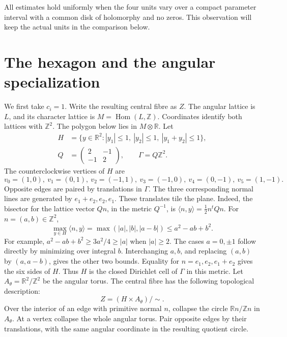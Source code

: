 All estimates hold uniformly when the four units vary over a compact
parameter interval with a common disk of holomorphy and no zeros.
This observation will keep the actual units in the comparison below.

\section{The hexagon and the angular specialization}

We first take $c_i=1$. Write the resulting central fibre as $Z$.
The angular lattice is $L$, and its character lattice is
$M=\operatorname{Hom}(L,\mathbb Z)$.
Coordinates identify both lattices with $\mathbb Z^2$.
The polygon below lies in $M\otimes\mathbb R$.
Let
\begin{equation}\label{c26:eq:hexagon}
\begin{split}
H&=\{y\in\mathbb R^2: |y_1|\le1,\ |y_2|\le1,\ |y_1+y_2|\le1\},\\
Q&=\begin{pmatrix}2&-1\\-1&2\end{pmatrix},\qquad \Gamma=Q\mathbb Z^2.
\end{split}
\end{equation}
The counterclockwise vertices of $H$ are
\[
v_0=(1,0),\ v_1=(0,1),\ v_2=(-1,1),\ v_3=(-1,0),\
v_4=(0,-1),\ v_5=(1,-1).
\]
Opposite edges are paired by translations in $\Gamma$.
The three corresponding normal lines are generated by
$e_1+e_2,e_2,e_1$.
These translates tile the plane.
Indeed, the bisector for the lattice vector $Qn$, in the metric $Q^{-1}$,
is $\langle n,y\rangle=\frac12n^tQn$.
For $n=(a,b)\in\mathbb Z^2$,
\[
\max_{y\in H}\langle n,y\rangle
 =\max(|a|,|b|,|a-b|)\le a^2-ab+b^2.
\]
For example, $a^2-ab+b^2\ge3a^2/4\ge|a|$ when $|a|\ge2$.
The cases $a=0,\pm1$ follow directly by minimizing over integral $b$.
Interchanging $a,b$, and replacing $(a,b)$ by $(a,a-b)$,
gives the other two bounds.
Equality for $n=e_1,e_2,e_1+e_2$ gives the six sides of $H$.
Thus $H$ is the closed Dirichlet cell of $\Gamma$ in this metric.
Let $A_\theta=\mathbb R^2/\mathbb Z^2$ be the angular torus.
The central fibre has the following topological description:
\begin{equation}\label{c26:eq:Z}
Z=(H\times A_\theta)/\sim.
\end{equation}
Over the interior of an edge with primitive normal $n$, collapse the
circle $\mathbb Rn/\mathbb Zn$ in $A_\theta$.
At a vertex collapse the whole angular torus.
Pair opposite edges by their translations, with the same angular
coordinate in the resulting quotient circle.

